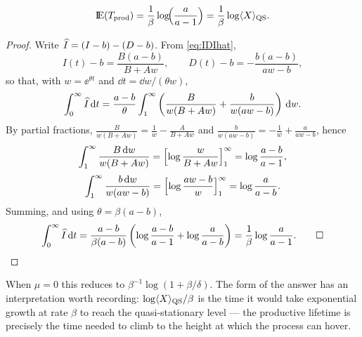 \begin{proposition}
\label{prop:lifetime}
\begin{equation}
{\rm I}\!{\rm E}(T_{\rm prod})
=\frac{1}{\beta}\log\!\Bigl(\frac{a}{a-1}\Bigr)
=\frac{1}{\beta}\log\langle X\rangle_{\rm QS}.
\end{equation}
\end{proposition}

\begin{proof}
Write $\widehat{I}=(I-b)-(D-b)$. From \eqref{eq:IDIhat},
$$
I(t)-b=\frac{B(a-b)}{B+Aw},
\qquad
D(t)-b=-\frac{b(a-b)}{aw-b},
$$
so that, with $w=\ee^{\theta t}$ and $\dd t=\dd w/(\theta w)$,
$$
\int_0^\infty\widehat{I}\,{\rm d} t
=\frac{a-b}{\theta}\int_1^\infty
\left(\frac{B}{w(B+Aw)}+\frac{b}{w(aw-b)}\right)\,{\rm d} w.
$$
By partial fractions,
$\frac{B}{w(B+Aw)}=\frac{1}{w}-\frac{A}{B+Aw}$ and
$\frac{b}{w(aw-b)}=-\frac{1}{w}+\frac{a}{aw-b}$, hence
$$
\int_1^\infty\frac{B\,{\rm d} w}{w(B+Aw)}
=\Bigl[\log\frac{w}{B+Aw}\Bigr]_1^\infty
=\log\frac{a-b}{a-1},
$$
$$
\int_1^\infty\frac{b\,{\rm d} w}{w(aw-b)}
=\Bigl[\log\frac{aw-b}{w}\Bigr]_1^\infty
=\log\frac{a}{a-b}.
$$
Summing, and using $\theta=\beta(a-b)$,
$$
\int_0^\infty\widehat{I}\,{\rm d} t
=\frac{a-b}{\beta(a-b)}
\left(\log\frac{a-b}{a-1}+\log\frac{a}{a-b}\right)
=\frac{1}{\beta}\log\frac{a}{a-1}.\qquad\square
$$
\end{proof}

When $\mu=0$ this reduces to $\beta^{-1}\log(1+\beta/\delta)$. The form of
the answer has an interpretation worth recording:
$\log\langle X\rangle_{\rm QS}/\beta$ is the time it would take exponential
growth at rate $\beta$ to reach the quasi-stationary level --- the productive
lifetime is precisely the time needed to climb to the height at which the
process can hover.
